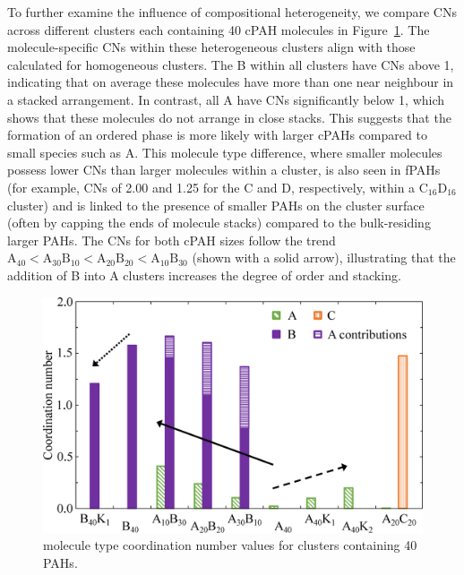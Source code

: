 To further examine the influence of compositional heterogeneity, we compare CNs across different clusters each containing 40 cPAH molecules in Figure~\ref{fig:coordination_numbers}. The molecule-specific CNs within these heterogeneous clusters align with those calculated for homogeneous clusters. The B within all clusters have CNs above 1, indicating that on average these molecules have more than one near neighbour in a stacked arrangement. In contrast, all A have CNs significantly below 1, which shows that these molecules do not arrange in close stacks.  This suggests that the formation of an ordered phase is more likely with larger cPAHs compared to small species such as A. 
This molecule type difference, where smaller molecules possess lower CNs than larger molecules within a cluster, is also seen in fPAHs (for example, CNs of 2.00 and 1.25 for the C and D, respectively, within a $\text{C}_{\text{16}}\text{D}_{\text{16}}$ cluster) and is linked to the presence of smaller PAHs on the cluster surface (often by capping the ends of molecule stacks) compared to the bulk-residing larger PAHs.
The CNs for both cPAH sizes follow the trend $\text{A}_{\text{40}} < \text{A}_{\text{30}}\text{B}_{\text{10}} < \text{A}_{\text{20}}\text{B}_{\text{20}} < \text{A}_{\text{10}}\text{B}_{\text{30}}$ (shown with a solid arrow), illustrating that the addition of B into A clusters increases the degree of order and stacking.
%
\begin{figure}[!bth]
\centering
\includegraphics[width=0.8\linewidth]{Figures/CN_bar_chart_updated.eps}
\caption{molecule type coordination number values for clusters containing 40 PAHs.}
\label{fig:coordination_numbers}
\end{figure}

